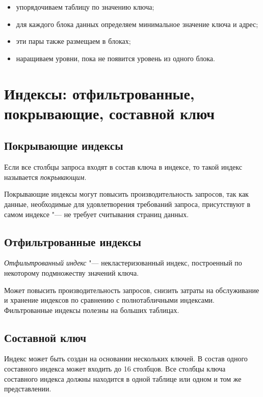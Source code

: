 \begin{itemize}
	\item упорядочиваем таблицу по значению ключа;
	\item для каждого блока данных определяем минимальное значение ключа и адрес;
	\item эти пары также размещаем в блоках;
	\item наращиваем уровни, пока не появится уровень из одного блока.
\end{itemize}

\section{Индексы: отфильтрованные, покрывающие, составной ключ}

\subsection*{Покрывающие индексы}

\begin{definition}
	Если все столбцы запроса входят в состав ключа в индексе, то такой индекс называется \emph{покрывающим}.
\end{definition}

Покрывающие индексы могут повысить производительность запросов, так как данные, необходимые для удовлетворения требований запроса, присутствуют в самом индексе "--- не требует считывания страниц данных.

\subsection*{Отфильтрованные индексы}

\begin{definition}
	\emph{Отфильтрованный индекс} "--- некластеризованный индекс, построенный по некоторому подмножеству значений ключа.
\end{definition}

Может повысить производительность запросов, снизить затраты на обслуживание и хранение индексов по сравнению с полнотабличными индексами.
Фильтрованные индексы полезны на больших таблицах.

\subsection*{Составной ключ}

Индекс может быть создан на основании нескольких ключей.
В состав одного составного индекса может входить до 16 столбцов.
Все столбцы ключа составного индекса должны находится в одной таблице или одном и том же представлении.

